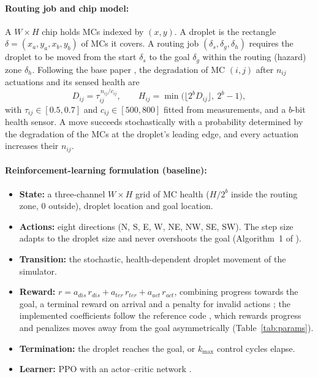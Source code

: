 \documentclass[11pt,a4paper]{article}
\begin{document}
\paragraph{Routing job and chip model:}
A $W\times H$ chip holds MCs indexed by $(x,y)$. A droplet is the rectangle
$\delta=(x_a,y_a,x_b,y_b)$ of MCs it covers. A routing job
$(\delta_s,\delta_g,\delta_h)$ requires the droplet to be moved from the start
$\delta_s$ to the goal $\delta_g$ within the routing (hazard) zone
$\delta_h$. Following the base paper \cite{elfar2023}, the degradation of MC
$(i,j)$ after $n_{ij}$ actuations and its sensed health are
\begin{equation}
  D_{ij}=\tau_{ij}^{\,n_{ij}/c_{ij}}, \qquad
  H_{ij}=\min\!\big(\big\lfloor 2^{b} D_{ij}\big\rfloor,\ 2^{b}-1\big),
\end{equation}
with $\tau_{ij}\in[0.5,0.7]$ and $c_{ij}\in[500,800]$ fitted from
measurements, and a $b$-bit health sensor. A move succeeds stochastically
with a probability determined by the degradation of the MCs at the droplet's
leading edge, and every actuation increases their $n_{ij}$.

\paragraph{Reinforcement-learning formulation (baseline):}
\begin{itemize}
  \item \textbf{State:} a three-channel $W\times H$ grid of MC health
        ($H/2^b$ inside the routing zone, 0 outside), droplet location and
        goal location.
  \item \textbf{Actions:} eight directions (N, S, E, W, NE, NW, SE, SW). The
        step size adapts to the droplet size and never overshoots the goal
        (Algorithm~1 of \cite{elfar2023}).
  \item \textbf{Transition:} the stochastic, health-dependent droplet movement
        of the simulator.
  \item \textbf{Reward:} $r = a_{dis}\,r_{dis} + a_{ter}\,r_{ter} + a_{act}\,r_{act}$,
        combining progress towards the goal, a terminal reward on arrival and a
        penalty for invalid actions \cite{elfar2023}; the implemented
        coefficients follow the reference code \cite{elfarcode}, which
        rewards progress and penalizes moves away from the goal asymmetrically
        (Table~\ref{tab:params}).
  \item \textbf{Termination:} the droplet reaches the goal, or $k_{\max}$
        control cycles elapse.
  \item \textbf{Learner:} PPO with an actor--critic network \cite{schulman2017}.
\end{itemize}
\end{document}
